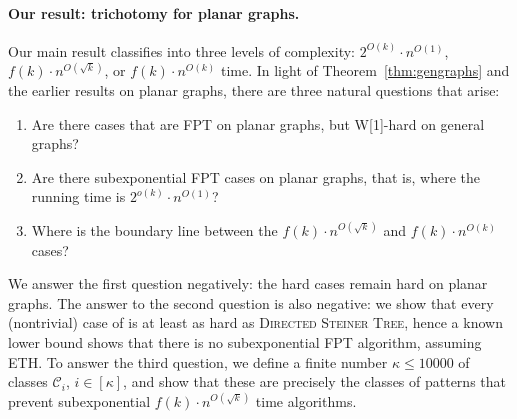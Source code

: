 \paragraph{Our result: trichotomy for planar graphs.}
Our main result classifies \Dsnfull into three levels of complexity: 
$2^{O(k)}\cdot n^{O(1)}$, $f(k)\cdot n^{O(\sqrt{k})}$, or $f(k)\cdot n^{O(k)}$ time.
In light of Theorem~\ref{thm:gengraphs} and the earlier results on planar graphs, there are three natural questions that arise:
\begin{enumerate}
\item Are there cases that are FPT on planar graphs, but W[1]-hard on general graphs?
  \item Are there subexponential FPT cases on planar graphs, that is, where the running time is $2^{o(k)}\cdot n^{O(1)}$?
\item Where is the boundary line between the $f(k) \cdot n^{O(\sqrt{k})}$ and $f(k)\cdot n^{O(k)}$ cases?
\end{enumerate}
We answer the first question negatively: the hard cases remain hard on planar graphs. The answer to the second question is also negative: we show that every (nontrivial) case of \Dsn is at least as hard as \textsc{Directed Steiner Tree}, hence a known lower bound \cite{DBLP:conf/focs/MarxPP18} shows that there is no subexponential FPT algorithm, assuming ETH. 
To answer the third question, we define a finite number $\kappa\le 10000$ of classes $\mathcal{C}_i$, $i\in[\kappa]$, and show that these are precisely the classes of patterns that prevent subexponential $f(k) \cdot n^{O(\sqrt{k})}$ time algorithms.
\medskip

